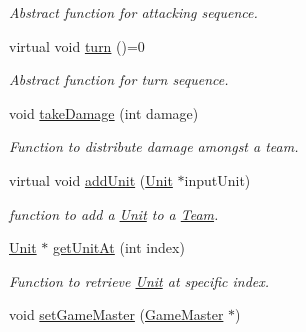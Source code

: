 \begin{DoxyCompactItemize}
\begin{DoxyCompactList}\small\item\em Abstract function for attacking sequence. \end{DoxyCompactList}\item 
\hypertarget{class_team_a016ca6682fff81eac2301bd6bf80db88}{}virtual void \hyperlink{class_team_a016ca6682fff81eac2301bd6bf80db88}{turn} ()=0\label{class_team_a016ca6682fff81eac2301bd6bf80db88}

\begin{DoxyCompactList}\small\item\em Abstract function for turn sequence. \end{DoxyCompactList}\item 
\hypertarget{class_team_aad3a08035daa8dc5abe0795a010d141d}{}void \hyperlink{class_team_aad3a08035daa8dc5abe0795a010d141d}{take\+Damage} (int damage)\label{class_team_aad3a08035daa8dc5abe0795a010d141d}

\begin{DoxyCompactList}\small\item\em Function to distribute damage amongst a team. \end{DoxyCompactList}\item 
\hypertarget{class_team_ad2d0d41421eeccbc1184b1a17c5e8112}{}virtual void \hyperlink{class_team_ad2d0d41421eeccbc1184b1a17c5e8112}{add\+Unit} (\hyperlink{class_unit}{Unit} $\ast$input\+Unit)\label{class_team_ad2d0d41421eeccbc1184b1a17c5e8112}

\begin{DoxyCompactList}\small\item\em function to add a \hyperlink{class_unit}{Unit} to a \hyperlink{class_team}{Team}. \end{DoxyCompactList}\item 
\hyperlink{class_unit}{Unit} $\ast$ \hyperlink{class_team_a453dc0ebd17df8f83fd619dd898287f8}{get\+Unit\+At} (int index)
\begin{DoxyCompactList}\small\item\em Function to retrieve \hyperlink{class_unit}{Unit} at specific index. \end{DoxyCompactList}\item 
\hypertarget{class_team_a8e5ac06209b2e02b81e717e204c2b162}{}void \hyperlink{class_team_a8e5ac06209b2e02b81e717e204c2b162}{set\+Game\+Master} (\hyperlink{class_game_master}{Game\+Master} $\ast$)\label{class_team_a8e5ac06209b2e02b81e717e204c2b162}


\end{DoxyCompactItemize}
